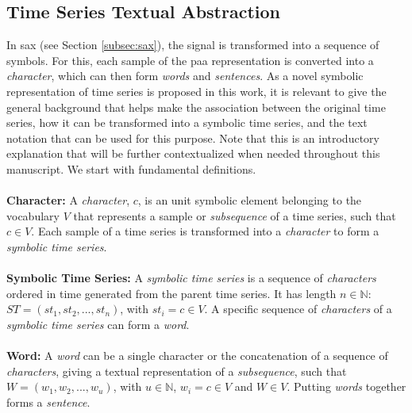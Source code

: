 
\subsection{Time Series Textual Abstraction}
\label{subsec:text_abstraction}

In \gls{sax} (see Section \ref{subsec:sax}), the signal is transformed into a sequence of symbols. For this, each sample of the \gls{paa} representation is converted into a \textit{character}, which can then form \textit{words} and \textit{sentences}. As a novel symbolic representation of time series is proposed in this work, it is relevant to give the general background that helps make the association between the original time series, how it can be transformed into a symbolic time series, and the text notation that can be used for this purpose. Note that this is an introductory explanation that will be further contextualized when needed throughout this manuscript. We start with fundamental definitions.\\\\
\textbf{Character:} A \textit{character}, $c$, is an unit symbolic element belonging to the vocabulary $V$ that represents a sample or \textit{subsequence} of a time series, such that $c \in V$. Each sample of a time series is transformed into a \textit{character} to form a \textit{symbolic time series}.\\\\
\textbf{Symbolic Time Series:} A \textit{symbolic time series} is a sequence of \textit{characters} ordered in time generated from the parent time series. It has length $n \in \mathbb{N}$: $ST = (st_1, st_2, ..., st_n)$, with $st_i = c \in V$. A specific sequence of \textit{characters} of a \textit{symbolic time series} can form a \textit{word}.\\\\
\textbf{Word:} A \textit{word} can be a single character or the concatenation of a sequence of \textit{characters}, giving a textual representation of a \textit{subsequence}, such that $W = (w_1, w_2, ..., w_u)$, with $u \in \mathbb{N}$, $w_i = c \in V$ and $W \in V$. Putting \textit{words} together forms a \textit{sentence}.\\\\
